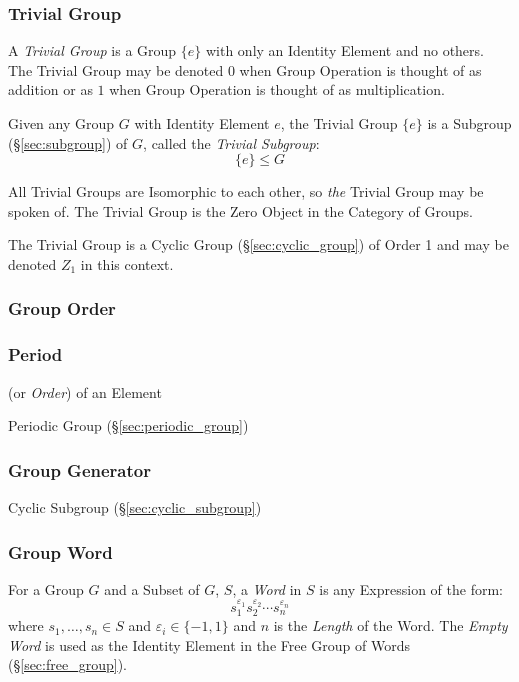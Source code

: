 \subsubsection{Trivial Group}\label{sec:trivial_group}

A \emph{Trivial Group} is a Group $\{e\}$ with only an Identity
Element and no others. The Trivial Group may be denoted $0$ when
Group Operation is thought of as addition or as $1$ when Group
Operation is thought of as multiplication.

Given any Group $G$ with Identity Element $e$, the Trivial Group
$\{e\}$ is a Subgroup (\S\ref{sec:subgroup}) of $G$, called the
\emph{Trivial Subgroup}:
\[
    \{e\} \leq G
\]

All Trivial Groups are Isomorphic to each other, so \emph{the} Trivial
Group may be spoken of. The Trivial Group is the Zero Object in the
Category of Groups.

The Trivial Group is a Cyclic Group (\S\ref{sec:cyclic_group}) of
Order 1 and may be denoted $Z_1$ in this context.



\subsubsection{Group Order}\label{sec:group_order}

\subsubsection{Period}\label{sec:period}

(or \emph{Order}) of an Element

Periodic Group (\S\ref{sec:periodic_group})



\subsubsection{Group Generator}\label{sec:group_generator}

Cyclic Subgroup (\S\ref{sec:cyclic_subgroup})



\subsubsection{Group Word}\label{sec:group_word}

For a Group $G$ and a Subset of $G$, $S$, a \emph{Word} in $S$ is any
Expression of the form:
\[
    s_1^{\varepsilon_1}s_2^{\varepsilon_2} \cdots s_n^{\varepsilon_n}
\]
where $s_1,\ldots,s_n \in S$ and $\varepsilon_i \in \{-1, 1\}$ and $n$
is the \emph{Length} of the Word. The \emph{Empty Word} is used as the
Identity Element in the Free Group of Words (\S\ref{sec:free_group}).



